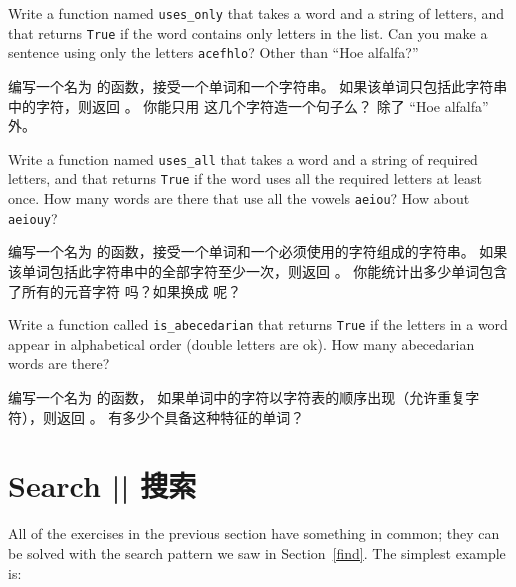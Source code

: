 \begin{exercise}

Write a function named \verb"uses_only" that takes a word and a
string of letters, and that returns {\tt True} if the word contains
only letters in the list.  Can you make a sentence using only the
letters {\tt acefhlo}?  Other than ``Hoe alfalfa?''

编写一个名为  的函数，接受一个单词和一个字符串。
如果该单词只包括此字符串中的字符，则返回 。
你能只用  这几个字符造一个句子么？ 除了 ``Hoe alfalfa'' 外。

\end{exercise}


\begin{exercise}

Write a function named \verb"uses_all" that takes a word and a
string of required letters, and that returns {\tt True} if the word
uses all the required letters at least once.  How many words are there
that use all the vowels {\tt aeiou}?  How about {\tt aeiouy}?

编写一个名为  的函数，接受一个单词和一个必须使用的字符组成的字符串。
如果该单词包括此字符串中的全部字符至少一次，则返回 。
你能统计出多少单词包含了所有的元音字符 吗？如果换成  呢？

\end{exercise}


\begin{exercise}

Write a function called \verb"is_abecedarian" that returns
{\tt True} if the letters in a word appear in alphabetical order
(double letters are ok).
How many abecedarian words are there?

编写一个名为  的函数， 如果单词中的字符以字符表的顺序出现（允许重复字符），则返回  。
有多少个具备这种特征的单词？


\end{exercise}



\section{Search  ||  搜索}
\label{search}
  

All of the exercises in the previous section have something
in common; they can be solved with the search pattern we saw
in Section~\ref{find}.  The simplest example is:

